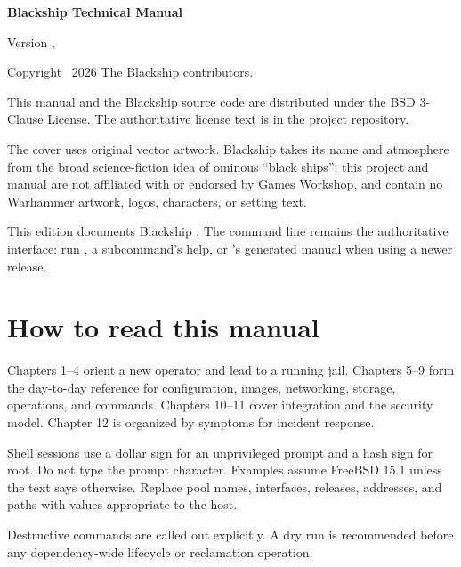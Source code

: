 \thispagestyle{empty}
\vspace*{\fill}

{\Large\bfseries Blackship Technical Manual}\par
\vspace{0.5em}
Version \BlackshipVersion, \ManualEdition

\vspace{2em}
Copyright \textcopyright\ 2026 The Blackship contributors.

This manual and the Blackship source code are distributed under the BSD
3-Clause License. The authoritative license text is in the project repository.

The cover uses original vector artwork. Blackship takes its name and atmosphere
from the broad science-fiction idea of ominous ``black ships''; this project and
manual are not affiliated with or endorsed by Games Workshop, and contain no
Warhammer artwork, logos, characters, or setting text.

\vspace{2em}
\begin{shipnote}
This edition documents Blackship \BlackshipVersion. The command line remains the
authoritative interface: run , a subcommand's help,
or 's generated manual when using a newer release.
\end{shipnote}

\vspace*{\fill}
\clearpage

\chapter*{How to read this manual}

Chapters 1--4 orient a new operator and lead to a running jail. Chapters 5--9
form the day-to-day reference for configuration, images, networking, storage,
operations, and commands. Chapters 10--11 cover integration and the security
model. Chapter 12 is organized by symptoms for incident response.

Shell sessions use a dollar sign for an unprivileged prompt and a hash sign for
root. Do not type the prompt character. Examples assume FreeBSD 15.1 unless the
text says otherwise. Replace pool names, interfaces, releases, addresses, and
paths with values appropriate to the host.

Destructive commands are called out explicitly. A dry run is recommended before
any dependency-wide lifecycle or reclamation operation.
\clearpage
